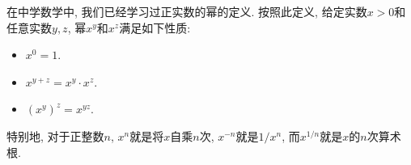 

在中学数学中, 我们已经学习过正实数的幂的定义. 按照此定义, 给定实数$x>0$和任意实数$y,z$, 幂$x^y$和$x^z$满足如下性质:

\begin{itemize}
\item $x^0=1$.
\item $x^{y+z}=x^y\cdot x^z$.
\item $(x^y)^z=x^{yz}$.
\end{itemize}

特别地, 对于正整数$n$, $x^n$就是将$x$自乘$n$次, $x^{-n}$就是$1/x^n$, 而$x^{1/n}$就是$x$的$n$次算术根.